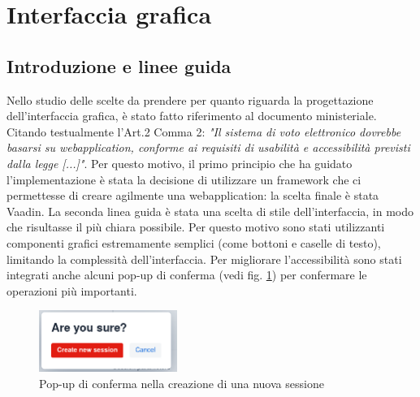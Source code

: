 \section{Interfaccia grafica}\label{gui}

\subsection{Introduzione e linee guida}
Nello studio delle scelte da prendere per quanto riguarda la progettazione dell'interfaccia grafica, è stato fatto riferimento al documento ministeriale. Citando testualmente l'Art.2 Comma 2: \emph{"Il sistema di voto elettronico dovrebbe basarsi su webapplication, conforme ai requisiti di usabilità e accessibilità previsti dalla legge [...]"}. 
Per questo motivo, il primo principio che ha guidato l'implementazione è stata la decisione di utilizzare un framework che ci permettesse di creare agilmente una webapplication: la scelta finale è stata Vaadin.
La seconda linea guida è stata una scelta di stile dell'interfaccia, in modo che risultasse il più chiara possibile. Per questo motivo sono stati utilizzanti componenti grafici estremamente semplici (come bottoni e caselle di testo), limitando la complessità dell'interfaccia.
Per migliorare l'accessibilità sono stati integrati anche alcuni pop-up di conferma (vedi fig. \ref{screeenshot:newsessionconfirm}) per confermare le operazioni più importanti.
\begin{figure}
	\centering
	\includegraphics[width=0.4\textwidth]{img/gui/newSessionConfirm.png}
	\caption{Pop-up di conferma nella creazione di una nuova sessione}
	\label{screeenshot:newsessionconfirm}
\end{figure}

